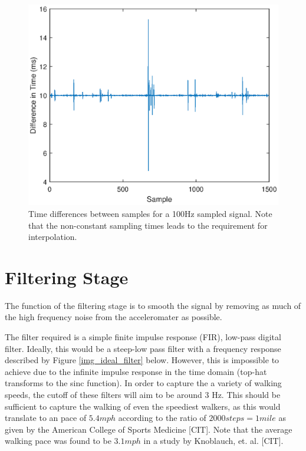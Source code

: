             \begin{figure}[h]
                \includegraphics[width=\textwidth]{Images/sampling_freq.eps}
                \centering
                \caption{Time differences between samples for a 100Hz sampled signal. Note that the non-constant sampling times leads to the requirement for interpolation.}
                \label{img_sampling_freq}
            \end{figure}

        \section{Filtering Stage}

            The function of the filtering stage is to smooth the signal by removing as much of the high frequency noise from the acceleromater as possible.

            The filter required is a simple finite impulse response (FIR), low-pass digital filter. Ideally, this would be a steep-low pass filter with a frequency response described by Figure \ref{img_ideal_filter} below. However, this is impossible to achieve due to the infinite impulse response in the time domain (top-hat transforms to the sinc function). In order to capture the a variety of walking speeds, the cutoff of these filters will aim to be around 3 Hz. This should be sufficient to capture the walking of even the speediest walkers, as this would translate to an pace of $5.4 mph$ according to the ratio of $2000 steps = 1 mile$ as given by the American College of Sports Medicine [CIT]. Note that the average walking pace was found to be $3.1 mph$ in a study by Knoblauch, et. al. [CIT].



